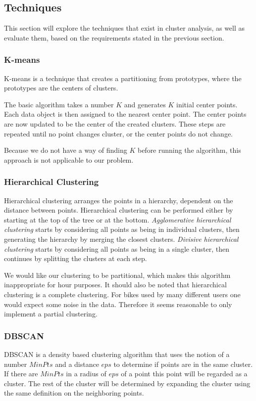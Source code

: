 \subsection{Techniques}
This section will explore the techniques that exist in cluster analysis, as well as evaluate them, based on the requirements stated in the previous section.

\subsubsection{K-means}
K-means is a technique that creates a partitioning from prototypes, where the prototypes are the centers of clusters.

The basic algorithm takes a number $K$ and generates $K$ initial center points.
Each data object is then assigned to the nearest center point.
The center points are now updated to be the center of the created clusters.
These steps are repeated until no point changes cluster, or the center points do not change.

Because we do not have a way of finding $K$ before running the algorithm, this approach is not applicable to our problem.

\subsubsection{Hierarchical Clustering}
Hierarchical clustering arranges the points in a hierarchy, dependent on the distance between points.
Hierarchical clustering can be performed either by starting at the top of the tree or at the bottom.
\textit{Agglomerative hierarchical clustering} starts by considering all points as being in individual clusters, then generating the hierarchy by merging the closest clusters.
\textit{Divisive hierarchical clustering} starts by considering all points as being in a single cluster, then continues by splitting the clusters at each step.

We would like our clustering to be partitional, which makes this algorithm inappropriate for hour purposes.
It should also be noted that hierarchical clustering is a complete clustering.
For bikes used by many different users one would expect some noise in the data.
Therefore it seems reasonable to only implement a partial clustering.

\subsubsection{DBSCAN}
DBSCAN is a density based clustering algorithm that uses the notion of a number $ MinPts $ and a distance $ eps $ to determine if points are in the same cluster.
If there are $ MinPts $ in a radius of $ eps $ of a point this point will be regarded as a cluster. 
The rest of the cluster will be determined by expanding the cluster using the same definition on the neighboring points.

